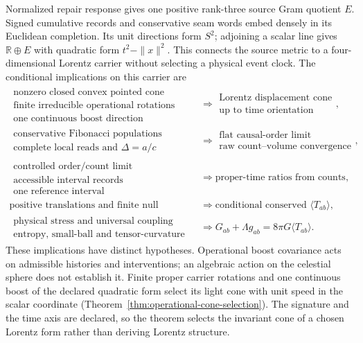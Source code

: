 \documentclass[11pt]{article}
\begin{document}
Normalized repair response gives one positive rank-three source Gram
quotient $E$. Signed cumulative records and conservative seam words embed
densely in its Euclidean completion. Its unit directions form $S^2$;
adjoining a scalar line gives $\mathbb R\oplus E$ with quadratic form
$t^2-\|x\|^2$. This connects the source metric to a four-dimensional
Lorentz carrier without selecting a physical event clock. The conditional
implications on this carrier are
\[
\begin{aligned}
\substack{\text{nonzero closed convex pointed cone}\\
\text{finite irreducible operational rotations}\\
\text{one continuous boost direction}}
&\Longrightarrow
\substack{\text{Lorentz displacement cone}\\
\text{up to time orientation}},\\[1mm]
\substack{\text{conservative Fibonacci populations}\\
\text{complete local reads and }\Delta=a/c}
&\Longrightarrow
\substack{\text{flat causal-order limit}\\
\text{raw count--volume convergence}},\\[1mm]
\substack{\text{controlled order/count limit}\\
\text{accessible interval records}\\
\text{one reference interval}}
&\Longrightarrow
\text{proper-time ratios from counts},\\[1mm]
\text{positive translations and finite null tomography}
&\Longrightarrow
\text{conditional conserved }\langle T_{ab}\rangle,\\[1mm]
\substack{\text{physical stress and universal coupling}\\
\text{entropy, small-ball and tensor-curvature limits}}
&\Longrightarrow
G_{ab}+\Lambda g_{ab}=8\pi G\langle T_{ab}\rangle .
\end{aligned}
\]
These implications have distinct hypotheses. Operational boost covariance
acts on admissible histories and interventions; an algebraic action on the
celestial sphere does not establish it. Finite proper carrier rotations and
one continuous boost of the declared quadratic form select its light cone with
unit speed in the scalar coordinate
(Theorem~\ref{thm:operational-cone-selection}). The signature and the time
axis are declared, so the theorem selects the invariant cone of a chosen
Lorentz form rather than deriving Lorentz structure.
\end{document}
